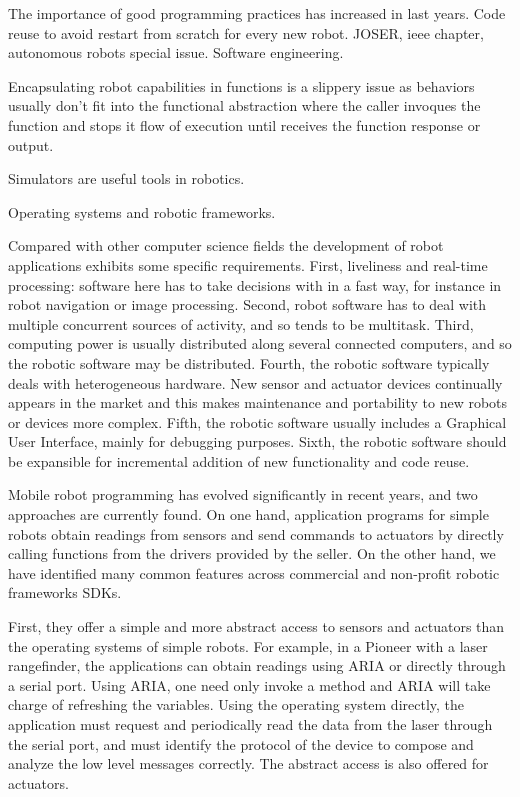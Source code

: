\documentclass[twocolumn]{svjour3}          %
\begin{document}
The importance of good programming practices has increased in last years. Code reuse to avoid restart from scratch for every new robot. JOSER, ieee chapter, autonomous robots special issue. Software engineering.

Encapsulating robot capabilities in functions is a slippery issue as behaviors usually don't fit into the functional abstraction where the caller invoques the function and stops it flow of execution until receives the function response or output.

Simulators are useful tools in robotics.

Operating systems and robotic frameworks.

Compared with other computer science fields the development of robot applications exhibits some specific requirements. First, liveliness and real-time processing: software here has to take decisions with in a fast way, for instance in robot navigation or image processing. Second, robot software has to deal with multiple concurrent sources of activity, and so tends to be multitask. Third, computing power is usually distributed along several connected computers, and so the robotic software may be distributed. Fourth, the robotic software typically deals with heterogeneous hardware. New sensor and actuator devices continually appears in the market and this makes maintenance and portability to new robots or devices more complex. Fifth, the robotic software usually includes a Graphical User Interface, mainly for debugging purposes. Sixth, the robotic software should be expansible for incremental addition of new functionality and code reuse.

Mobile robot programming has evolved significantly in recent years, and two approaches are currently found. On one hand, application programs for simple robots obtain readings from sensors and send commands to actuators by directly calling functions from the drivers provided by the seller. On the other hand, we have identified many common features across commercial and non-profit robotic frameworks SDKs.

First, they offer a simple and more abstract access to sensors and actuators than the operating systems of simple robots. For example, in a Pioneer with a laser rangefinder, the applications can obtain readings using ARIA or directly through a serial port. Using ARIA, one need only invoke a method and ARIA will take charge of refreshing the variables. Using the operating system directly, the application must request and periodically read the data from the laser through the serial port, and must identify the protocol of the
device to compose and analyze the low level messages correctly. The abstract access is also offered for actuators.
\end{document}
